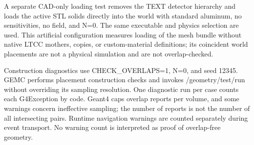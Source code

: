 A separate CAD-only loading test removes the TEXT detector hierarchy and loads the active STL solids directly
into the world with standard aluminum, no sensitivities, no field, and N=0. The same executable and physics
selection are used. This artificial configuration measures loading of the mesh bundle without native LTCC
mothers, copies, or custom-material definitions; its coincident world placements are not a physical simulation
and are not overlap-checked.

Construction diagnostics use CHECK\_OVERLAPS=1, N=0, and seed 12345. GEMC performs placement construction
checks and invokes /geometry/test/run without overriding its sampling resolution. One diagnostic run per case
counts each G4Exception by code. Geant4 caps overlap reports per volume, and some warnings concern ineffective
sampling; the number of reports is not the number of all intersecting pairs. Runtime navigation warnings are
counted separately during event transport. No warning count is interpreted as proof of overlap-free geometry.
